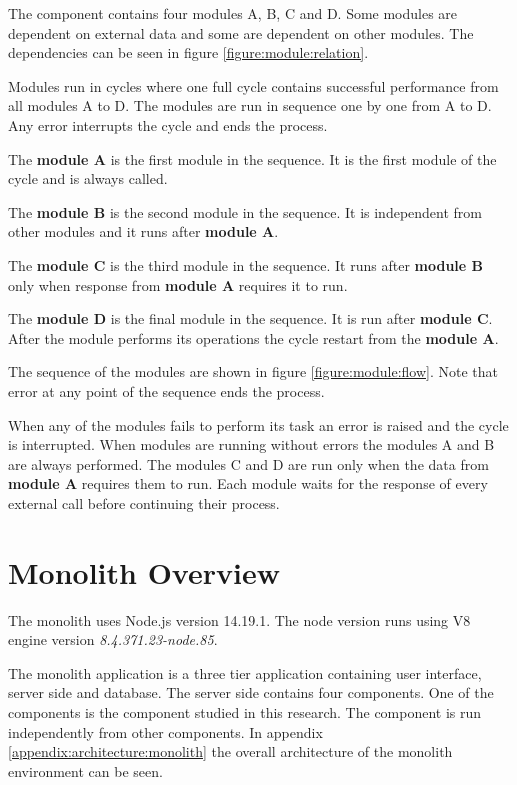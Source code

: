 The component contains four modules A, B, C and D.
Some modules are dependent on external data and some are dependent on other modules.
The dependencies can be seen in figure \ref{figure:module:relation}.

Modules run in cycles where one full cycle contains successful performance from all modules A to D.
The modules are run in sequence one by one from A to D.
Any error interrupts the cycle and ends the process.

The \textbf{module A} is the first module in the sequence.
It is the first module of the cycle and is always called.

The \textbf{module B} is the second module in the sequence.
It is independent from other modules and it runs after \textbf{module A}.

The \textbf{module C} is the third module in the sequence.
It runs after \textbf{module B} only when response from \textbf{module A} requires it to run.

The \textbf{module D} is the final module in the sequence.
It is run after \textbf{module C}.
After the module performs its operations the cycle restart from the \textbf{module A}.

The sequence of the modules are shown in figure \ref{figure:module:flow}.
Note that error at any point of the sequence ends the process.

When any of the modules fails to perform its task an error is raised and the cycle is interrupted.
When modules are running without errors the modules A and B are always performed. 
The modules C and D are run only when the data from \textbf{module A} requires them to run.
Each module waits for the response of every external call before continuing their process.

\section{Monolith Overview}
The monolith uses Node.js version 14.19.1. The node version runs using V8 engine version \textit{8.4.371.23-node.85}.

The monolith application is a three tier application containing user interface, server side and database.
The server side contains four components.
One of the components is the component studied in this research.
The component is run independently from other components.
In appendix \ref{appendix:architecture:monolith} the overall architecture of the monolith environment can be seen.

